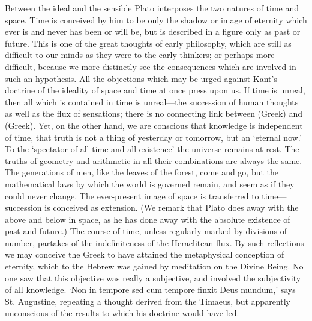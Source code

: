 Between the ideal and the sensible Plato interposes the two natures of
time and space. Time is conceived by him to be only the shadow or image of
eternity which ever is and never has been or will be, but is described in
a figure only as past or future. This is one of the great thoughts of
early philosophy, which are still as difficult to our minds as they were
to the early thinkers; or perhaps more difficult, because we more
distinctly see the consequences which are involved in such an hypothesis.
All the objections which may be urged against Kant’s doctrine of the
ideality of space and time at once press upon us. If time is unreal, then
all which is contained in time is unreal—the succession of human
thoughts as well as the flux of sensations; there is no connecting link
between (Greek) and (Greek). Yet, on the other hand, we are conscious that
knowledge is independent of time, that truth is not a thing of yesterday
or tomorrow, but an ‘eternal now.’ To the ‘spectator of all time and all
existence’ the universe remains at rest. The truths of geometry and
arithmetic in all their combinations are always the same. The generations
of men, like the leaves of the forest, come and go, but the mathematical
laws by which the world is governed remain, and seem as if they could
never change. The ever-present image of space is transferred to time—succession
is conceived as extension. (We remark that Plato does away with the above
and below in space, as he has done away with the absolute existence of
past and future.) The course of time, unless regularly marked by divisions
of number, partakes of the indefiniteness of the Heraclitean flux. By such
reflections we may conceive the Greek to have attained the metaphysical
conception of eternity, which to the Hebrew was gained by meditation on
the Divine Being. No one saw that this objective was really a subjective,
and involved the subjectivity of all knowledge. ‘Non in tempore sed cum
tempore finxit Deus mundum,’ says St. Augustine, repeating a thought
derived from the Timaeus, but apparently unconscious of the results to
which his doctrine would have led.

